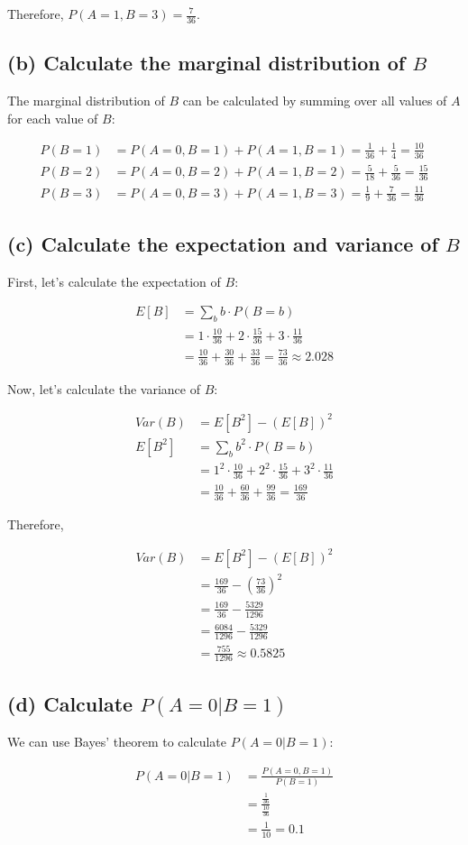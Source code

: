 \documentclass{article}
\begin{document}
Therefore, $P(A = 1, B = 3) = \frac{7}{36}$.

\subsection*{(b) Calculate the marginal distribution of $B$}

The marginal distribution of $B$ can be calculated by summing over all values of $A$ for each value of $B$:

\begin{align*}
P(B = 1) &= P(A = 0, B = 1) + P(A = 1, B = 1) = \frac{1}{36} + \frac{1}{4} = \frac{10}{36} \\
P(B = 2) &= P(A = 0, B = 2) + P(A = 1, B = 2) = \frac{5}{18} + \frac{5}{36} = \frac{15}{36} \\
P(B = 3) &= P(A = 0, B = 3) + P(A = 1, B = 3) = \frac{1}{9} + \frac{7}{36} = \frac{11}{36}
\end{align*}

\subsection*{(c) Calculate the expectation and variance of $B$}

First, let's calculate the expectation of $B$:

\begin{align*}
E[B] &= \sum_{b} b \cdot P(B = b) \\
&= 1 \cdot \frac{10}{36} + 2 \cdot \frac{15}{36} + 3 \cdot \frac{11}{36} \\
&= \frac{10}{36} + \frac{30}{36} + \frac{33}{36} = \frac{73}{36} \approx 2.028
\end{align*}

Now, let's calculate the variance of $B$:

\begin{align*}
Var(B) &= E[B^2] - (E[B])^2 \\
E[B^2] &= \sum_{b} b^2 \cdot P(B = b) \\
&= 1^2 \cdot \frac{10}{36} + 2^2 \cdot \frac{15}{36} + 3^2 \cdot \frac{11}{36} \\
&= \frac{10}{36} + \frac{60}{36} + \frac{99}{36} = \frac{169}{36}
\end{align*}

Therefore,

\begin{align*}
Var(B) &= E[B^2] - (E[B])^2 \\
&= \frac{169}{36} - (\frac{73}{36})^2 \\
&= \frac{169}{36} - \frac{5329}{1296} \\
&= \frac{6084}{1296} - \frac{5329}{1296} \\
&= \frac{755}{1296} \approx 0.5825
\end{align*}

\subsection*{(d) Calculate $P(A = 0|B = 1)$}

We can use Bayes' theorem to calculate $P(A = 0|B = 1)$:

\begin{align*}
P(A = 0|B = 1) &= \frac{P(A = 0, B = 1)}{P(B = 1)} \\
&= \frac{\frac{1}{36}}{\frac{10}{36}} \\
&= \frac{1}{10} = 0.1
\end{align*}
\end{document}
